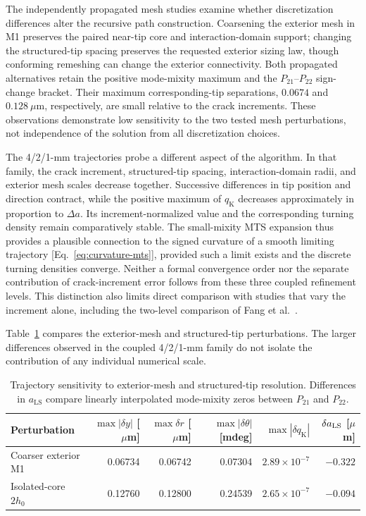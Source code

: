 \documentclass[11pt]{article}
\begin{document}
The independently propagated mesh studies examine whether
discretization differences alter the recursive path construction.
Coarsening the exterior mesh in M1 preserves the paired near-tip
core and interaction-domain support; changing the structured-tip
spacing preserves the requested exterior sizing law, though
conforming remeshing can change the exterior connectivity.
Both propagated alternatives retain the positive mode-mixity
maximum and the $P_{21}$--$P_{22}$ sign-change bracket.
Their maximum corresponding-tip separations, $0.0674$ and
$0.128~\mu\mathrm{m}$, respectively, are small relative to
the crack increments. These observations demonstrate low
sensitivity to the two tested mesh perturbations, not
independence of the solution from all discretization choices.

The 4/2/1-mm trajectories probe a different aspect of the
algorithm. In that family, the crack increment, structured-tip
spacing, interaction-domain radii, and exterior mesh scales
decrease together. Successive differences in tip position and
direction contract, while the positive maximum of
$q_{\mathrm{K}}$ decreases approximately in proportion to
$\Delta a$. Its increment-normalized value and the
corresponding turning density remain comparatively stable.
The small-mixity MTS expansion thus provides a plausible
connection to the signed curvature of a smooth limiting
trajectory [Eq.~\eqref{eq:curvature-mts}], provided such a
limit exists and the discrete turning densities converge.
Neither a formal convergence order nor the separate
contribution of crack-increment error follows from these
three coupled refinement levels. This distinction also
limits direct comparison with studies that vary the
increment alone, including the two-level comparison of
Fang et al.~\cite{FangEtAl2020}.

Table~\ref{tab:independent-sensitivity} compares the
exterior-mesh and structured-tip perturbations. The larger
differences observed in the coupled 4/2/1-mm family do
not isolate the contribution of any individual numerical scale.

\begin{table}[htbp]
\centering
\small
\setlength{\tabcolsep}{4.2pt}
\caption{Trajectory sensitivity to exterior-mesh and structured-tip
resolution. Differences in $a_{\mathrm{LS}}$ compare linearly
interpolated mode-mixity zeros between $P_{21}$ and $P_{22}$.}
\label{tab:independent-sensitivity}
\begin{tabular}{lrrrrr}
\toprule
Perturbation &
$\max|\delta y|$ [$\mu$m] &
$\max\delta r$ [$\mu$m] &
$\max|\delta\theta|$ [mdeg] &
$\max|\delta q_{\mathrm{K}}|$ &
$\delta a_{\rm LS}$ [$\mu$m]\\
\midrule
Coarser exterior M1 & 0.06734 & 0.06742 & 0.07304 & $2.89\times10^{-7}$ & $-0.322$\\
Isolated-core $2h_0$ & 0.12760 & 0.12800 & 0.24539 & $2.65\times10^{-7}$ & $-0.094$\\
\bottomrule
\end{tabular}
\end{table}
\FloatBarrier
\end{document}
